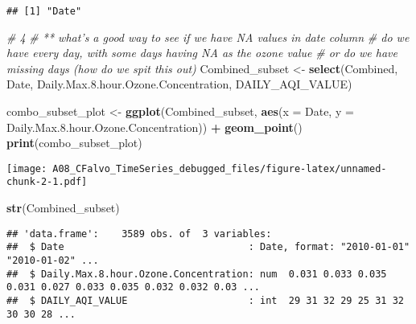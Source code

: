 \documentclass[]{article}
\newenvironment{Shaded}{\begin{snugshade}}{\end{snugshade}}
\newcommand{\CommentTok}[1]{\textcolor[rgb]{0.56,0.35,0.01}{\textit{#1}}}
\newcommand{\DataTypeTok}[1]{\textcolor[rgb]{0.13,0.29,0.53}{#1}}
\newcommand{\FloatTok}[1]{\textcolor[rgb]{0.00,0.00,0.81}{#1}}
\newcommand{\KeywordTok}[1]{\textcolor[rgb]{0.13,0.29,0.53}{\textbf{#1}}}
\newcommand{\NormalTok}[1]{#1}
\newcommand{\OperatorTok}[1]{\textcolor[rgb]{0.81,0.36,0.00}{\textbf{#1}}}
\newcommand{\StringTok}[1]{\textcolor[rgb]{0.31,0.60,0.02}{#1}}
\begin{document}
\begin{verbatim}
## [1] "Date"
\end{verbatim}

\begin{Shaded}
\begin{Highlighting}[]
\CommentTok{# 4}
\CommentTok{# ** what's a good way to see if we have NA values in date column}
  \CommentTok{# do we have every day, with some days having NA as the ozone value}
  \CommentTok{# or do we have missing days (how do we spit this out)}
\NormalTok{Combined_subset <-}\StringTok{ }\KeywordTok{select}\NormalTok{(Combined, Date, Daily.Max.}\FloatTok{8.}\NormalTok{hour.Ozone.Concentration, DAILY_AQI_VALUE)}

\NormalTok{combo_subset_plot <-}\StringTok{ }
\StringTok{  }\KeywordTok{ggplot}\NormalTok{(Combined_subset, }\KeywordTok{aes}\NormalTok{(}\DataTypeTok{x =}\NormalTok{ Date, }\DataTypeTok{y =}\NormalTok{ Daily.Max.}\FloatTok{8.}\NormalTok{hour.Ozone.Concentration)) }\OperatorTok{+}
\StringTok{  }\KeywordTok{geom_point}\NormalTok{()}
\KeywordTok{print}\NormalTok{(combo_subset_plot)}
\end{Highlighting}
\end{Shaded}

\texttt{[image: A08\_CFalvo\_TimeSeries\_debugged\_files/figure-latex/unnamed-chunk-2-1.pdf]}

\begin{Shaded}
\begin{Highlighting}[]
\KeywordTok{str}\NormalTok{(Combined_subset)}
\end{Highlighting}
\end{Shaded}

\begin{verbatim}
## 'data.frame':    3589 obs. of  3 variables:
##  $ Date                                : Date, format: "2010-01-01" "2010-01-02" ...
##  $ Daily.Max.8.hour.Ozone.Concentration: num  0.031 0.033 0.035 0.031 0.027 0.033 0.035 0.032 0.032 0.03 ...
##  $ DAILY_AQI_VALUE                     : int  29 31 32 29 25 31 32 30 30 28 ...
\end{verbatim}
\end{document}
